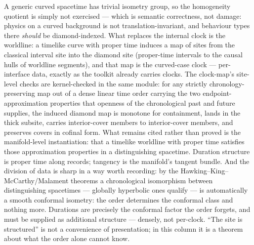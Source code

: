 A generic curved spacetime has trivial isometry group, so the
homogeneity quotient is simply not exercised --- which is semantic
correctness, not damage: physics on a curved background is not
translation-invariant, and behaviour types there \emph{should} be
diamond-indexed. What replaces the internal clock is the worldline: a
timelike curve with proper time induces a map of sites
from the classical interval site into the diamond site (proper-time
intervals to the causal hulls of worldline segments), and that map is
the curved-case clock --- per-interface data, exactly as the toolkit
already carries clocks. The clock-map's site-level checks are
kernel-checked in the same module: for any strictly chronology-preserving map out of a
dense linear time order carrying the two endpoint-approximation
properties that openness of the chronological past and future
supplies, the induced diamond map is monotone for containment, lands
in the thick subsite, carries interior-cover members to
interior-cover members, and preserves covers in cofinal form. What
remains cited rather than proved is the manifold-level instantiation:
that a timelike worldline with proper time satisfies those
approximation properties in a distinguishing spacetime. Duration
structure is proper time along records; tangency is the manifold's
tangent bundle. And the division of data is sharp in a way worth
recording: by the Hawking--King--McCarthy/Malament theorems
\cite{hkm76, malament77} a chronological isomorphism between
distinguishing spacetimes --- globally hyperbolic ones qualify ---
is automatically a smooth conformal isometry: the order determines
the conformal class and nothing more. Durations are precisely the
conformal factor the order forgets, and must be supplied as
additional structure --- densely, not per-clock. ``The site is
structured'' is not a convenience of presentation; in this column it
is a theorem about what the order alone cannot know.

